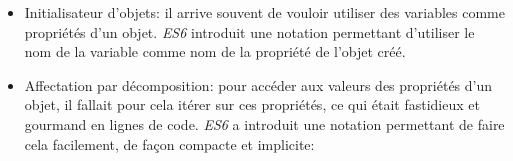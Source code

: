 \begin{itemize}
\begin{Shaded}
\begin{Highlighting}[]
  \OperatorTok{=} \OperatorTok{,} \OperatorTok{=} \NormalTok{) }\OperatorTok{\{}
     \OperatorTok{+} 
\OperatorTok{\};}
  \OperatorTok{,} \OperatorTok{\{}
     \OperatorTok{===} \NormalTok{)}
        \OperatorTok{=} \OperatorTok{;}
     \OperatorTok{===} \NormalTok{)}
        \OperatorTok{=} \OperatorTok{;}
     \OperatorTok{+} \OperatorTok{;}
\OperatorTok{\};}
\end{Highlighting}
\end{Shaded}
\item
  Initialisateur d'objets: il arrive souvent de vouloir utiliser des
  variables comme propriétés d'un objet. \emph{ES6} introduit une
  notation permettant d'utiliser le nom de la variable comme nom de la
  propriété de l'objet créé.

\begin{Shaded}
\begin{Highlighting}[]
\OperatorTok{=} \OperatorTok{\{} \OperatorTok{,} \OperatorTok{\}}
\OperatorTok{=} \OperatorTok{\{} \OperatorTok{:} \OperatorTok{,} \OperatorTok{:} \OperatorTok{\};}
\end{Highlighting}
\end{Shaded}
\item
  Affectation par décomposition: pour accéder aux valeurs des propriétés
  d'un objet, il fallait pour cela itérer sur ces propriétés, ce qui
  était fastidieux et gourmand en lignes de code. \emph{ES6} a introduit
  une notation permettant de faire cela facilement, de façon compacte et
  implicite:


\end{itemize}
